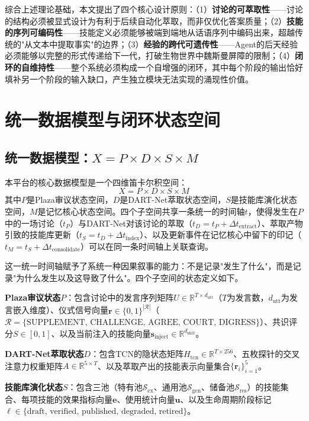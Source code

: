 \documentclass[12pt,a4paper]{ctexart}
\def\R{\mathbb{R}}
\begin{document}
综合上述理论基础，本文提出了四个核心设计原则：（1）\textbf{讨论的可萃取性}——讨论的结构必须被显式设计为有利于后续自动化萃取，而非仅优化答案质量；（2）\textbf{技能的序列可编码性}——技能定义必须能够被端到端地从话语序列中编码出来，超越传统的"从文本中提取事实"的边界；（3）\textbf{经验的跨代可遗传性}——Agent的后天经验必须能够以完整的形式传递给下一代，打破生物世界中魏斯曼屏障的限制；（4）\textbf{闭环的自维持性}——整个系统必须构成一个自增强的闭环，其中每个阶段的输出恰好填补另一个阶段的输入缺口，产生独立模块无法实现的涌现性价值。

\section{统一数据模型与闭环状态空间}

\subsection{统一数据模型：$X = P \times D \times S \times M$}

本平台的核心数据模型是一个四维笛卡尔积空间：
\begin{equation}
X = P \times D \times S \times M
\label{eq:unified_model}
\end{equation}
其中$P$是Plaza审议状态空间，$D$是DART-Net萃取状态空间，$S$是技能库演化状态空间，$M$是记忆核心状态空间。四个子空间共享一条统一的时间轴$t$，使得发生在$P$中的一场讨论（$t_P$）与DART-Net对该讨论的萃取（$t_D = t_P + \Delta t_{\text{extract}}$）、萃取产物引致的技能库更新（$t_S = t_D + \Delta t_{\text{index}}$）、以及更新事件在记忆核心中留下的印记（$t_M = t_S + \Delta t_{\text{consolidate}}$）可以在同一条时间轴上关联查询。

这一统一时间轴赋予了系统一种因果叙事的能力：不是记录"发生了什么"，而是记录"为什么发生以及这导致了什么"。四个子空间的状态定义如下。

\textbf{Plaza审议状态$P$}：包含讨论中的发言序列矩阵$U \in \R^{T \times d_{\text{utt}}}$（$T$为发言数，$d_{\text{utt}}$为发言嵌入维度）、仪式信号向量$\mathbf{r} \in \{0,1\}^{|\mathcal{R}|}$（$\mathcal{R} = \{\text{SUPPLEMENT, CHALLENGE, AGREE, COURT, DIGRESS}\}$）、共识评分$S \in [0,1]$、以及当前注入的技能向量$\mathbf{s}_{\text{inject}} \in \R^{d_{\text{skill}}}$。

\textbf{DART-Net萃取状态$D$}：包含TCN的隐状态矩阵$H_{\text{tcn}} \in \R^{T \times 256}$、五枚探针的交叉注意力权重矩阵$A \in \R^{5 \times T}$、以及萃取产出的技能表示向量集合$\{\mathbf{r}_i\}_{i=1}^{5}$。

\textbf{技能库演化状态$S$}：包含三池（特有池$\mathcal{S}_{\text{ex}}$、通用池$\mathcal{S}_{\text{gen}}$、储备池$\mathcal{S}_{\text{res}}$）的技能集合、每项技能的效果指标向量$\mathbf{e}$、使用统计向量$\mathbf{u}$、以及生命周期阶段标记$\ell \in \{\text{draft, verified, published, degraded, retired}\}$。
\end{document}
